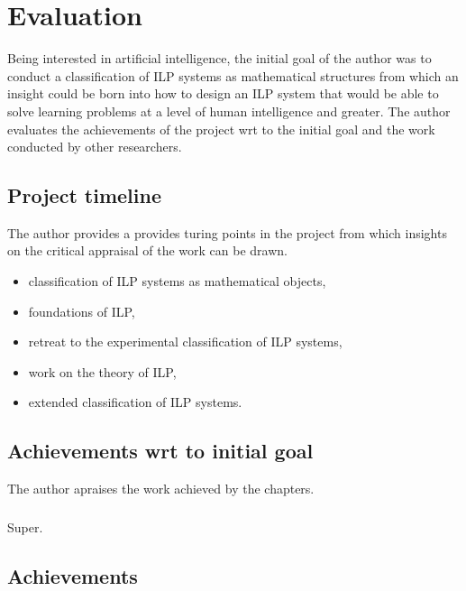 \chapter{Evaluation}
Being interested in artificial intelligence, the initial goal of the author was to conduct a classification of ILP systems as mathematical structures from which an insight could be born into how to design an ILP system that would be able to solve learning problems at a level of human intelligence and greater. The author evaluates the achievements of the project wrt to the initial goal and the work conducted by other researchers.

\section{Project timeline}
The author provides a provides turing points in the project from which insights on the critical appraisal of the work can be drawn.

\begin{itemize}
\item classification of ILP systems as mathematical objects,
\item foundations of ILP,
\item retreat to the experimental classification of ILP systems,
\item work on the theory of ILP,
\item extended classification of ILP systems.
\end{itemize}

\section{Achievements wrt to initial goal}
The author apraises the work achieved by the chapters.

\subsection{}


\subsection{}
Super.

\subsection{}

\subsection{}

\section{Achievements }